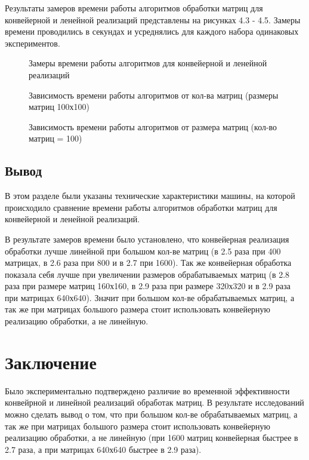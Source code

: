 \documentclass[a4paper,14pt, unknownkeysallowed]{extreport}
\newcommand{\img}[3] {
	\begin{figure}[h!]
		\center{\texttt{[image: img/\#2]}}
		\caption{#3}
		\label{img:#2}
	\end{figure}
}
\begin{document}
Результаты замеров времени работы алгоритмов обработки матриц для конвейерной и ленейной реализаций представлены на рисунках 4.3 - 4.5. Замеры времени проводились в секундах и усреднялись для каждого набора одинаковых экспериментов.

\img{180mm}{time}{Замеры времени работы алгоритмов для конвейерной и ленейной реализаций}

\img{110mm}{graph_diff_quantities}{Зависимость времени работы алгоритмов от кол-ва матриц (размеры матриц 100х100)}

\img{110mm}{graph_diff_sizes}{Зависимость времени работы алгоритмов от размера матриц (кол-во матриц = 100)}

\clearpage

\section{Вывод}

В этом разделе были указаны технические характеристики машины, на которой происходило сравнение времени работы алгоритмов обработки матриц для конвейерной и ленейной реализаций.

В результате замеров времени было установлено, что конвейерная реализация обработки лучше линейной
при большом кол-ве матриц (в 2.5 раза при 400 матрицах, в 2.6 раза при 800 и в 2.7 при 1600). Так же конвейерная обработка показала себя лучше при увеличении размеров обрабатываемых матриц (в 2.8 раза при размере матриц 160х160, в 2.9 раза при размере 320х320 и в 2.9 раза при матрицах 640х640). Значит при большом кол-ве обрабатываемых матриц, а так же при матрицах большого размера стоит использовать конвейерную реализацию обработки, а не линейную.





\chapter*{Заключение}

Было экспериментально подтверждено различие во временной эффективности конвейрной и линейной реализаций обработак матриц. В результате исследований можно сделать вывод о том, что при большом кол-ве обрабатываемых матриц, а так же при матрицах большого размера стоит использовать конвейерную реализацию обработки, а не линейную (при 1600 матриц конвейерная быстрее в 2.7 раза, а при матрицах 640х640 быстрее в 2.9 раза).
\end{document}
